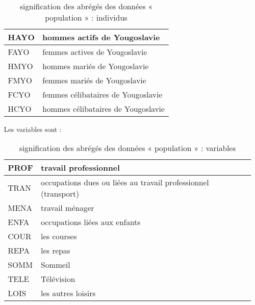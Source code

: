 \begin{table}[h]
\begin{tabular}{|l|l|}
HAYO  & hommes actifs de Yougoslavie            \\ \hline
FAYO  & femmes actives de Yougoslavie           \\ \hline
HMYO  & hommes mariés de Yougoslavie            \\ \hline
FMYO  & femmes mariés de Yougoslavie            \\ \hline
FCYO  & femmes célibataires de Yougoslavie      \\ \hline
HCYO  & hommes célibataires de Yougoslavie      \\ \hline
\end{tabular}
\caption{signification des abrégés des données « population » : individus}
\label{tab:my-table}
\end{table}

Les variables sont :

\begin{table}[h]
\centering
\begin{tabular}{|l|l|}
\hline
PROF & travail professionnel                                          \\ \hline
TRAN & occupations dues ou liées au travail professionnel (transport) \\ \hline
MENA & travail ménager                                                \\ \hline
ENFA & occupations liées aux enfants                                  \\ \hline
COUR & les courses                                                    \\ \hline
REPA & les repas                                                      \\ \hline
SOMM & Sommeil                                                        \\ \hline
TELE & Télévision                                                     \\ \hline
LOIS & les autres loisirs                                             \\ \hline
\end{tabular}
\caption{signification des abrégés des données « population » : variables}
\label{tab:my-table2}
\end{table}